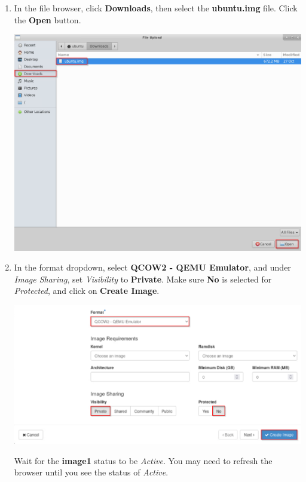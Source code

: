 \documentclass[letterpaper, 12pt]{article}
\begin{document}
\begin{enumerate}
    \item In the file browser, click \textbf{Downloads}, then select the \textbf{ubuntu.img} file. Click the
    \textbf{Open} button.

    \begin{center}
        \includegraphics[width=\linewidth]{images/part1/step5.png}
    \end{center}

    \item In the format dropdown, select \textbf{QCOW2 - QEMU Emulator}, and under \textit{Image Sharing}, set
    \textit{Visibility} to \textbf{Private}. Make sure \textbf{No} is selected for \textit{Protected}, and click on
    \textbf{Create Image}.

    \begin{center}
        \includegraphics[width=\linewidth]{images/part1/step6.png}
    \end{center}

    \begin{stopbox}
        Wait for the \textbf{image1} status to be \textit{Active}. You may need to refresh the browser until you see the
        status of \textit{Active}.
    \end{stopbox}


\end{enumerate}
\end{document}
